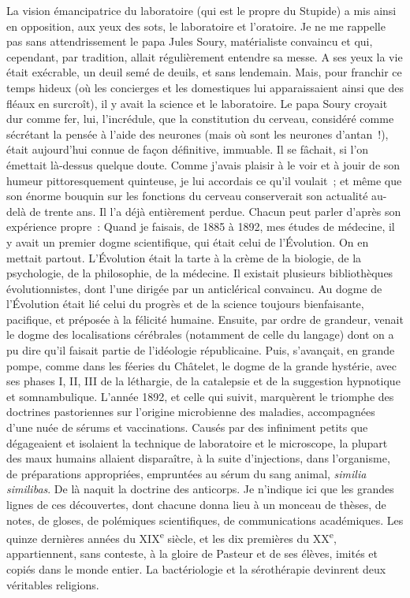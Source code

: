 \documentclass[french,twoside]{book} %
\begin{document}
La vision émancipatrice du laboratoire (qui est le propre du Stupide) a mis ainsi en opposition, aux yeux des sots, le laboratoire et l’oratoire. Je ne me rappelle pas sans attendrissement le papa Jules Soury, matérialiste convaincu et qui, cependant, par tradition, allait régulièrement entendre sa messe. A ses yeux la vie était exécrable, un deuil semé de deuils, et sans lendemain. Mais, pour franchir ce temps hideux (où les concierges et les domestiques lui apparaissaient ainsi que des fléaux en surcroît), il y avait la science et le laboratoire. Le papa Soury croyait dur comme fer, lui, l’incrédule, que la constitution du cerveau, considéré comme sécrétant la pensée à l’aide des neurones (mais où sont les neurones d’antan !), était aujourd’hui connue de façon définitive, immuable. Il se fâchait, si l’on émettait là-dessus quelque doute. Comme j’avais plaisir à le voir et à jouir de son humeur pittoresquement quinteuse, je lui accordais ce qu’il voulait ; et même que son énorme bouquin sur les fonctions du cerveau conserverait son actualité au-delà de trente ans. Il l’a déjà entièrement perdue. Chacun peut parler d’après son expérience propre : Quand je faisais, de 1885 à 1892, mes études de médecine, il y avait un premier dogme scientifique, qui était celui de l’Évolution. On en mettait partout. L’Évolution était la tarte à la crème de la biologie, de la psychologie, de la philosophie, de la médecine. Il existait plusieurs bibliothèques évolutionnistes, dont l’une dirigée par un anticlérical convaincu. Au dogme de l’Évolution était lié celui du progrès et de la science toujours bienfaisante, pacifique, et préposée à la félicité humaine. Ensuite, par ordre de grandeur, venait le dogme des localisations cérébrales (notamment de celle du langage) dont on a pu dire qu’il faisait partie de l’idéologie républicaine. Puis, s’avançait, en grande pompe, comme dans les féeries du Châtelet, le dogme de la grande hystérie, avec ses phases I, II, III de la léthargie, de la catalepsie et de la suggestion hypnotique et somnambulique. L’année 1892, et celle qui suivit, marquèrent le triomphe des doctrines pastoriennes sur l’origine microbienne des maladies, accompagnées d’une nuée de sérums et vaccinations. Causés par des infiniment petits que dégageaient et isolaient la technique de laboratoire et le microscope, la plupart des maux humains allaient disparaître, à la suite d’injections, dans l’organisme, de préparations appropriées, empruntées au sérum du sang animal, {\itshape similia similibas}. De là naquit la doctrine des anticorps. Je n’indique ici que les grandes lignes de ces découvertes, dont chacune donna lieu à un monceau de thèses, de notes, de gloses, de polémiques scientifiques, de communications académiques. Les quinze dernières années du XIX\textsuperscript{e} siècle, et les dix premières du XX\textsuperscript{e}, appartiennent, sans conteste, à la gloire de Pasteur et de ses élèves, imités et copiés dans le monde entier. La bactériologie et la sérothérapie devinrent deux véritables religions.\par
\end{document}
